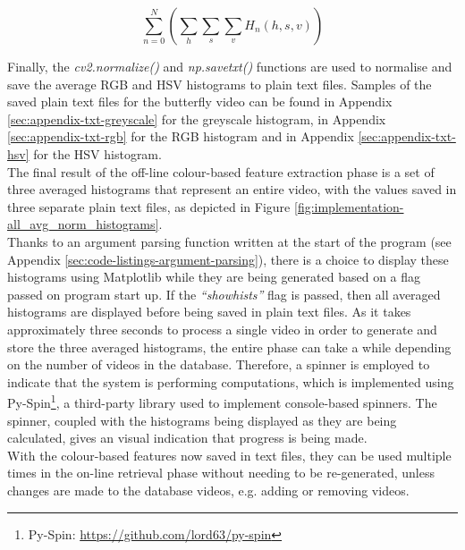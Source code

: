 \begin{equation}
\label{eq:average-hsv-histogram}
    \sum_{n=0}^{N}(\sum_h \sum_s \sum_v H_n(h,s,v))
\end{equation}

Finally, the \textit{cv2.normalize()} and \textit{np.savetxt()} functions are used to normalise and save the average RGB and HSV histograms to plain text files. Samples of the saved plain text files for the butterfly video can be found in Appendix \ref{sec:appendix-txt-greyscale} for the greyscale histogram, in Appendix \ref{sec:appendix-txt-rgb} for the RGB histogram and in Appendix \ref{sec:appendix-txt-hsv} for the HSV histogram.\\

The final result of the off-line colour-based feature extraction phase is a set of three averaged histograms that represent an entire video, with the values saved in three separate plain text files, as depicted in Figure \ref{fig:implementation-all_avg_norm_histograms}.\\

Thanks to an argument parsing function written at the start of the program (see Appendix \ref{sec:code-listings-argument-parsing}), there is a choice to display these histograms using Matplotlib while they are being generated based on a flag passed on program start up. If the \textit{``showhists''} flag is passed, then all averaged histograms are displayed before being saved in plain text files. As it takes approximately three seconds to process a single video in order to generate and store the three averaged histograms, the entire phase can take a while depending on the number of videos in the database. Therefore, a spinner is employed to indicate that the system is performing computations, which is implemented using Py-Spin\footnote{Py-Spin: \url{https://github.com/lord63/py-spin}}, a third-party library used to implement console-based spinners. The spinner, coupled with the histograms being displayed as they are being calculated, gives an visual indication that progress is being made.\\

With the colour-based features now saved in text files, they can be used multiple times in the on-line retrieval phase without needing to be re-generated, unless changes are made to the database videos, e.g. adding or removing videos.

